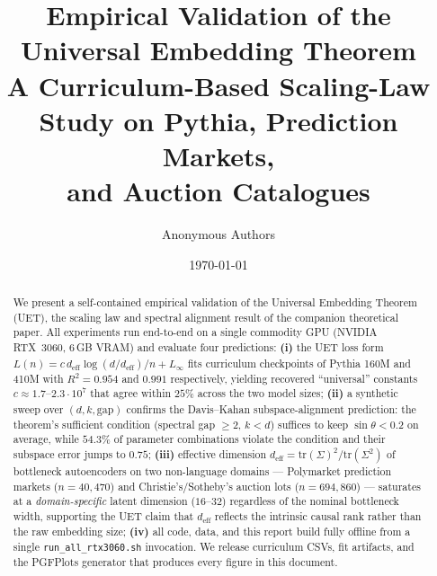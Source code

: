 \documentclass[11pt,a4paper]{article}
\title{%
  \textbf{Empirical Validation of the Universal Embedding Theorem}\\[4pt]
  \large A Curriculum-Based Scaling-Law Study on Pythia, Prediction Markets,\\
  and Auction Catalogues
}
\author{Anonymous Authors}
\date{\today \quad {\small (Working Draft --- companion to v3 of the UET paper)}}
\newcommand{\deff}{d_{\mathrm{eff}}}
\newcommand{\Linf}{L_{\infty}}
\newcommand{\tr}{\mathrm{tr}}
\newcommand{\repo}[1]{\texttt{\small #1}}
\theoremstyle{definition}
\theoremstyle{remark}
\begin{document}
\maketitle

\begin{abstract}
We present a self-contained empirical validation of the Universal Embedding
Theorem (UET), the scaling law and spectral alignment result of the companion
theoretical paper. All experiments run end-to-end on a single commodity GPU
(NVIDIA RTX~3060, 6\,GB VRAM) and evaluate four predictions:
\textbf{(i)} the UET loss form
$L(n) = c\,\deff\log(d/\deff)/n + \Linf$ fits
curriculum checkpoints of Pythia 160M and 410M with $R^2 = 0.954$ and $0.991$
respectively, yielding recovered ``universal'' constants
$c \approx 1.7\text{--}2.3 \cdot 10^{7}$ that agree within $25\%$ across the
two model sizes;
\textbf{(ii)} a synthetic sweep over $(d, k, \mathrm{gap})$ confirms the
Davis--Kahan subspace-alignment prediction: the theorem's sufficient condition
(spectral gap $\geq 2$, $k < d$) suffices to keep $\sin\theta < 0.2$ on
average, while $54.3\%$ of parameter combinations violate the condition and
their subspace error jumps to $0.75$;
\textbf{(iii)} effective dimension $\deff = \tr(\Sigma)^2/\tr(\Sigma^2)$ of
bottleneck autoencoders on two non-language domains --- Polymarket prediction
markets ($n{=}40{,}470$) and Christie's/Sotheby's auction lots
($n{=}694{,}860$) --- saturates at a \emph{domain-specific} latent dimension
($16\text{--}32$) regardless of the nominal bottleneck width, supporting the
UET claim that $\deff$ reflects the intrinsic causal rank rather than the
raw embedding size;
\textbf{(iv)} all code, data, and this report build fully offline from a
single \repo{run\_all\_rtx3060.sh} invocation.
We release curriculum CSVs, fit artifacts, and the PGFPlots generator that
produces every figure in this document.
\end{abstract}

\tableofcontents















\end{document}
